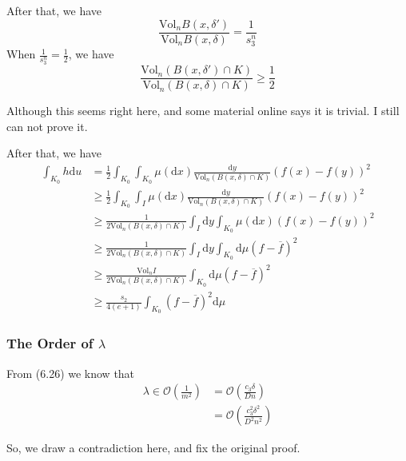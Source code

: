 \documentclass{article}
\begin{document}
After that, we have
\[\frac{\mathrm{Vol}_nB(x,\delta')}{\mathrm{Vol}_nB(x,\delta)} = \frac{1}{s_3^n}\]
When $\frac{1}{s_3^n} = \frac{1}{2}$, we have
\[\frac{\mathrm{Vol}_n(B(x,\delta')\cap K)}{\mathrm{Vol}_n(B(x,\delta)\cap K)} \geq \frac{1}{2}\]
\begin{tcolorbox}[title={Some Note}]
  Although this seems right here, and some material online says it is trivial. I still can not prove it.
\end{tcolorbox}
After that, we have
\begin{align*}
  \int_{K_0} h \mathrm{d}u &= \frac{1}{2}\int_{K_0}\int_{K_0} \mu(\mathrm{d}x) \frac{\mathrm{d}y}{\mathrm{Vol}_n (B(x, \delta)\cap K)}(f(x) - f(y))^2 \\
  &\geq \frac{1}{2}\int_{K_0}\int_{I} \mu(\mathrm{d}x) \frac{\mathrm{d}y}{\mathrm{Vol}_n (B(x, \delta)\cap K)}(f(x) - f(y))^2 \\
  &\geq \frac{1}{2\mathrm{Vol}_n(B(x,\delta)\cap K)} \int_{I}\mathrm{d} y\int_{K_0} \mu(\mathrm{d}x) (f(x) - f(y))^2\\
  &\geq \frac{1}{2\mathrm{Vol}_n(B(x,\delta)\cap K)} \int_{I}\mathrm{d} y\int_{K_0} \mathrm{d}\mu (f - \overline{f})^2\\
  &\geq \frac{\mathrm{Vol}_n I}{2\mathrm{Vol}_n(B(x,\delta)\cap K)} \int_{K_0} \mathrm{d}\mu (f - \overline{f})^2\\
  &\geq \frac{s_2}{4(e+1)} \int_{K_0} (f - \overline{f})^2 \mathrm{d}\mu
\end{align*}
\subsubsection{The Order of $\lambda$}
From (6.26) we know that
\begin{align*}
  \lambda \in \mathcal{O}(\frac{1}{m^2}) &=  \mathcal{O}(\frac{c_3\delta}{Dn}) \\
  &= \mathcal{O}(\frac{c_3^2\delta^2}{D^2n^2})
\end{align*}

So, we draw a contradiction here, and fix the original proof.
\end{document}
